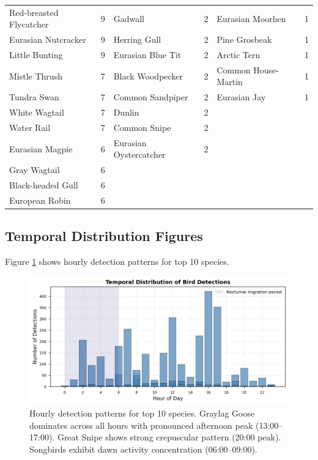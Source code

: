 \documentclass[twocolumn]{article}
\begin{document}
\begin{table}[H]
\begin{tabular}{lr|lr|lr}
Red-breasted Flycatcher & 9 & Gadwall & 2 & Eurasian Moorhen & 1 \\
Eurasian Nutcracker & 9 & Herring Gull & 2 & Pine Grosbeak & 1 \\
Little Bunting & 9 & Eurasian Blue Tit & 2 & Arctic Tern & 1 \\
Mistle Thrush & 7 & Black Woodpecker & 2 & Common House-Martin & 1 \\
Tundra Swan & 7 & Common Sandpiper & 2 & Eurasian Jay & 1 \\
White Wagtail & 7 & Dunlin & 2 &  &  \\
Water Rail & 7 & Common Snipe & 2 &  &  \\
Eurasian Magpie & 6 & Eurasian Oystercatcher & 2 &  &  \\
Gray Wagtail & 6 &  &  &  &  \\
Black-headed Gull & 6 &  &  &  &  \\
European Robin & 6 &  &  &  &  \\
\bottomrule
\end{tabular}
\end{table}

\subsection{Temporal Distribution Figures}

Figure \ref{fig:temporal} shows hourly detection patterns for top 10 species.

\begin{figure}[H]
\centering
\includegraphics[width=\textwidth]{figures/temporal_distribution.png}
\caption{Hourly detection patterns for top 10 species. Graylag Goose dominates across all hours with pronounced afternoon peak (13:00--17:00). Great Snipe shows strong crepuscular pattern (20:00 peak). Songbirds exhibit dawn activity concentration (06:00--09:00).}
\label{fig:temporal}
\end{figure}
\end{document}
